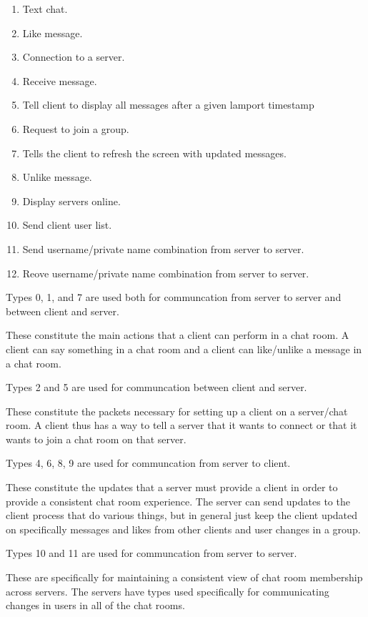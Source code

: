 \documentclass[12pt,journal,compsoc]{IEEEtran}
\begin{document}
\begin{enumerate}
\setcounter{enumi}{0}
\item Text chat.
\item Like message.
\item Connection to a server.
\item Receive message.
\item Tell client to display all messages after a given lamport timestamp
\item Request to join a group.
\item Tells the client to refresh the screen with updated messages.
\item Unlike message.
\item Display servers online.
\item Send client user list.
\item Send username/private name combination from server to server.
\item Reove username/private name combination from server to server.
\end{enumerate}

Types 0, 1, and 7 are used both for communcation from server to server and between client and server.

These constitute the main actions that a client can perform in a chat room. A client can say something in a chat room and a client can like/unlike a message in a chat room.

Types 2 and 5 are used for communcation between client and server.

These constitute the packets necessary for setting up a client on a server/chat room. A client thus has a way to tell a server that it wants to connect or that it wants to join a chat room on that server.

Types 4, 6, 8, 9 are used for communcation from server to client.

These constitute the updates that a server must provide a client in order to provide a consistent chat room experience. The server can send updates to the client process that do various things, but in general just keep the client updated on specifically messages and likes from other clients and user changes in a group.

Types 10 and 11 are used for communcation from server to server.

These are specifically for maintaining a consistent view of chat room membership across servers. The servers have types used specifically for communicating changes in users in all of the chat rooms.
\end{document}
